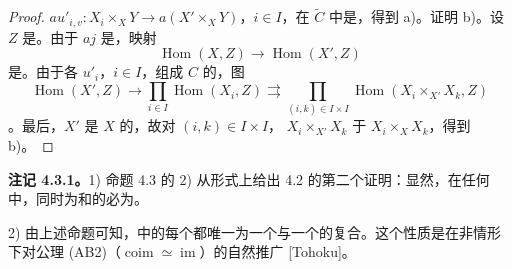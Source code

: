 \begin{proof}
$au'_{i,v}:X_i\times_XY\to a(X'\times_XY)$，$i\in I$，在 $\widetilde C$ 中是，得到 a)。证明 b)。设 $Z$ 是。由于 $aj$ 是，映射
\[\operatorname{Hom}(X,Z)\longrightarrow\operatorname{Hom}(X',Z)\]
是。由于各 $u'_i$，$i\in I$，组成 $\widehat C$ 的，图
\[\operatorname{Hom}(X',Z)\longrightarrow\prod_{i\in I}\operatorname{Hom}(X_i,Z)\rightrightarrows
\prod_{(i,k)\in I\times I}\operatorname{Hom}(X_i\times_{X'}X_k,Z)\]
。最后，$X'$ 是 $X$ 的，故对 $(i,k)\in I\times I$， $X_i\times_{X'}X_k$ 于 $X_i\times_XX_k$，得到 b)。
\end{proof}
\textbf{注记 4.3.1。}1) 命题 4.3 的 2) 从形式上给出 4.2 的第二个证明：显然，在任何中，同时为和的必为。

2) 由上述命题可知，中的每个都唯一为一个与一个的复合。这个性质是在非情形下对公理 (AB2)（$\operatorname{coim}\simeq\operatorname{im}$）的自然推广 [Tohoku]。

